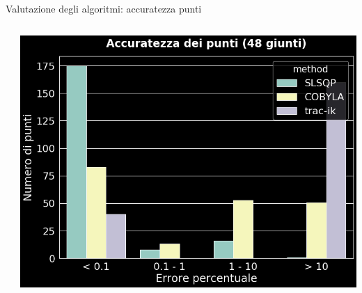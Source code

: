 \begin{frame}{Valutazione degli algoritmi: accuratezza punti}
\begin{columns}
\begin{column}{0.35\textwidth}
\hfill
\end{column}
\begin{column}{0.7\textwidth}
\includegraphics[width=\textwidth]{slide/img_cinematica_inversa/accuratezza_48.png}
\end{column}
\end{columns}
\end{frame}

